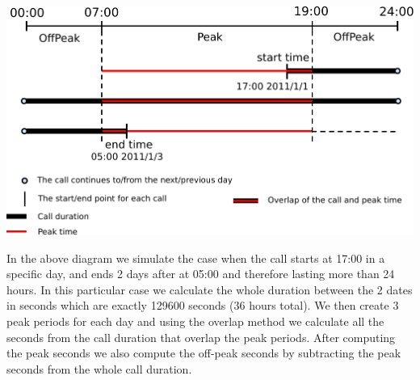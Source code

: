 \begin{center}
	\includegraphics[scale=0.75]{images/timeline.pdf}
\end{center}

In the above diagram we simulate the case when the call starts at 17:00 in a specific day, and ends 2 days after at 05:00 and therefore lasting more than 24 hours. In this particular case we calculate the whole duration between the 2 dates in seconds which are exactly 129600 seconds (36 hours total). We then create 3 peak periods for each day and using the overlap method we calculate all the seconds from the call duration that overlap the peak periods. After computing the peak seconds we also compute the off-peak seconds by subtracting the peak seconds from the whole call duration.

